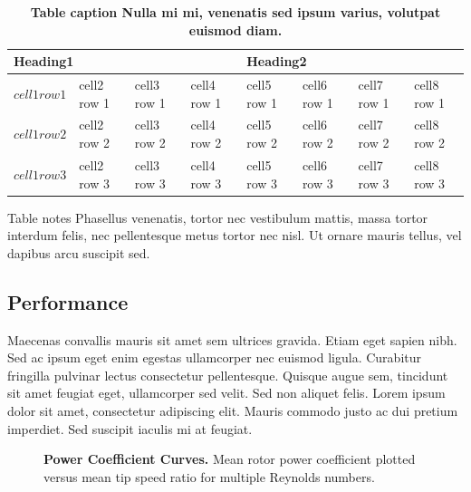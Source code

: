 \documentclass[10pt,letterpaper]{article}
\begin{document}
\begin{table}[!ht]
\begin{adjustwidth}{-2.25in}{0in} %
\caption{
{\bf Table caption Nulla mi mi, venenatis sed ipsum varius, volutpat euismod diam.}}
\begin{tabular}{|l|l|l|l|l|l|l|l|}
\hline
\multicolumn{4}{|l|}{\bf Heading1} & \multicolumn{4}{|l|}{\bf Heading2}\\ \hline
$cell1 row1$ & cell2 row 1 & cell3 row 1 & cell4 row 1 & cell5 row 1 & cell6 row 1 & cell7 row 1 & cell8 row 1\\ \hline
$cell1 row2$ & cell2 row 2 & cell3 row 2 & cell4 row 2 & cell5 row 2 & cell6 row 2 & cell7 row 2 & cell8 row 2\\ \hline
$cell1 row3$ & cell2 row 3 & cell3 row 3 & cell4 row 3 & cell5 row 3 & cell6 row 3 & cell7 row 3 & cell8 row 3\\ \hline
\end{tabular}
\begin{flushleft} 
Table notes Phasellus venenatis, tortor nec vestibulum mattis, massa tortor interdum felis, nec 
pellentesque metus tortor nec nisl. Ut ornare mauris tellus, vel dapibus arcu suscipit sed.
\end{flushleft}
\label{table1}
\end{adjustwidth}
\end{table}



\subsection*{Performance}

Maecenas convallis mauris sit amet sem ultrices gravida. Etiam eget sapien nibh.
Sed ac ipsum eget enim egestas ullamcorper nec euismod ligula. Curabitur
fringilla pulvinar lectus consectetur pellentesque. Quisque augue sem, tincidunt
sit amet feugiat eget, ullamcorper sed velit. Sed non aliquet felis. Lorem ipsum
dolor sit amet, consectetur adipiscing elit. Mauris commodo justo ac dui pretium
imperdiet. Sed suscipit iaculis mi at feugiat.


\begin{figure}[h]
\caption{{\bf Power Coefficient Curves.}
Mean rotor power coefficient plotted versus mean tip speed ratio for multiple
Reynolds numbers.}
\label{cp-curves}
\end{figure}
\end{document}
